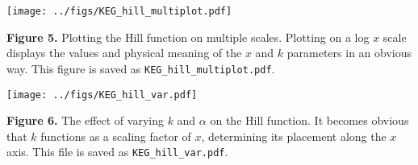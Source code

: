 \begin{itemize}
\begin{center}
	\texttt{[image: ../figs/KEG\_hill\_multiplot.pdf]}
\end{center}
	{\small \textbf{Figure 5.} Plotting the Hill function on multiple scales. Plotting on a log $x$
	scale displays the values and physical meaning of the $x$ and $k$
	parameters in an obvious way. This figure is saved as
	\texttt{KEG\_hill\_multiplot.pdf}.}

\begin{center}
	\texttt{[image: ../figs/KEG\_hill\_var.pdf]}
\end{center}
{\small \textbf{Figure 6.} The effect of varying $k$ and $\alpha$ on the Hill
	function. It becomes obvious that $k$ functions as a scaling factor of
$x$, determining its placement along the $x$ axis. This file is saved as
\texttt{KEG\_hill\_var.pdf}.}



\end{itemize}

